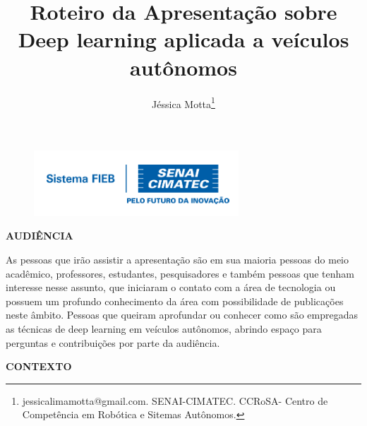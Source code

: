 \documentclass[12pt,a4paper]{article}
\begin{document}
 
\begin{figure}
    \flushright
    \includegraphics[scale=0.5]{Logo_senai.png}
\end{figure}

\title{Roteiro da Apresentação sobre Deep learning aplicada a veículos autônomos}
\author{Jéssica Motta\thanks{jessicalimamotta@gmail.com. SENAI-CIMATEC. CCRoSA- Centro de Competência em Robótica e Sitemas Autônomos.}}
 
 

    \maketitle
    \singlespacing


    \textbf{AUDIÊNCIA}

    \par As pessoas que irão assistir a apresentação são em sua maioria pessoas do meio acadêmico, professores, estudantes, pesquisadores e também pessoas que tenham interesse nesse assunto, que iniciaram o contato com a área de tecnologia ou possuem um profundo conhecimento da área com possibilidade de publicações neste âmbito. Pessoas que queiram aprofundar ou conhecer como são empregadas as técnicas de deep learning em veículos autônomos, abrindo espaço para perguntas e contribuições por parte da audiência.


    \textbf{CONTEXTO}
\end{document}
